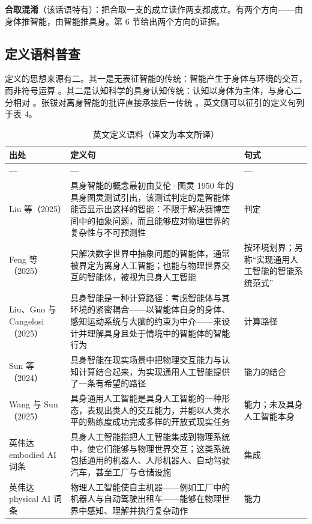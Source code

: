 \documentclass[10pt,fontset=fandol]{ctexart}
\begin{document}
\textbf{合取混淆}（该话语特有）：把合取一支的成立读作两支都成立。有两个方向——由身体推智能，由智能推具身。第 6 节给出两个方向的证据。

\subsection{定义语料普查}

定义的思想来源有二。其一是无表征智能的传统：智能产生于身体与环境的交互，而非符号运算 \cite{brooks1991,pfeifer2006}。其二是认知科学的具身认知传统：认知以身体为主体，与身心二分相对 \cite{varela1991,dreyfus1992,newen2018,shapiro2026}。张钹对离身智能的批评直接承接后一传统 \cite{zhangbo2025}。英文侧可以征引的定义句列于表 4。

\begin{table}[htbp]
\centering
\caption{英文定义语料（译文为本文所译）}
\small
\begin{tabularx}{\textwidth}{>{\raggedright\arraybackslash}p{3.3cm}Y>{\raggedright\arraybackslash}p{2.6cm}}
\toprule
出处 & 定义句 & 句式 \\
\midrule
--- & --- & --- \\
Liu 等（2025）\cite{liu2024survey} & 具身智能的概念最初由艾伦·图灵 1950 年的具身图灵测试引出，该测试判定的是智能体能否显示出这样的智能：不限于解决赛博空间中的抽象问题，而且能够应对物理世界的复杂性与不可预测性 & 判定 \\
Feng 等（2025）\cite{feng2025} & 只解决数字世界中抽象问题的智能体，通常被界定为离身人工智能；也能与物理世界交互的智能体，被视为具身人工智能 & 按环境划界；另称“实现通用人工智能的智能系统范式” \\
Liu、Guo 与 Cangelosi（2025）\cite{liu2025csur} & 具身智能是一种计算路径：考虑智能体与其环境的紧密耦合——以智能体自身的身体、感知运动系统与大脑的约束为中介——来设计并理解具身且处于情境中的智能体的智能行为 & 计算路径 \\
Sun 等（2024）\cite{sun2024} & 具身智能在现实场景中把物理交互能力与认知计算结合起来，为实现通用人工智能提供了一条有希望的路径 & 能力的结合 \\
Wang 与 Sun（2025）\cite{wangsung2025} & 具身通用人工智能是具身人工智能的一种形态，表现出类人的交互能力，并能以人类水平的熟练度成功完成多样的开放式现实任务 & 能力；未及具身人工智能本身 \\
英伟达 embodied AI 词条 \cite{nvglossary} & 具身人工智能指把人工智能集成到物理系统中，使它们能够与物理世界交互；这类系统包括通用的机器人、人形机器人、自动驾驶汽车，甚至工厂与仓储设施 & 集成 \\
英伟达 physical AI 词条 \cite{nvglossary} & 物理人工智能使自主机器——例如工厂中的机器人与自动驾驶出租车——能够在物理世界中感知、理解并执行复杂动作 & 能力 \\

\end{tabularx}
\end{table}
\end{document}

